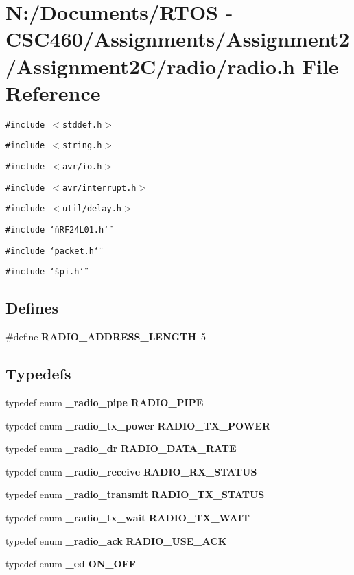 \section{N:/Documents/RTOS - CSC460/Assignments/Assignment2/Assignment2C/radio/radio.h File Reference}
\label{radio_8h}
{\tt \#include $<$stddef.h$>$}\par
{\tt \#include $<$string.h$>$}\par
{\tt \#include $<$avr/io.h$>$}\par
{\tt \#include $<$avr/interrupt.h$>$}\par
{\tt \#include $<$util/delay.h$>$}\par
{\tt \#include \char`\"{}n\-RF24L01.h\char`\"{}}\par
{\tt \#include \char`\"{}packet.h\char`\"{}}\par
{\tt \#include \char`\"{}spi.h\char`\"{}}\par
\subsection*{Defines}
\begin{CompactItemize}
\item 
\#define {\bf RADIO\_\-ADDRESS\_\-LENGTH}~5
\end{CompactItemize}
\subsection*{Typedefs}
\begin{CompactItemize}
\item 
typedef enum {\bf \_\-radio\_\-pipe} {\bf RADIO\_\-PIPE}
\item 
typedef enum {\bf \_\-radio\_\-tx\_\-power} {\bf RADIO\_\-TX\_\-POWER}
\item 
typedef enum {\bf \_\-radio\_\-dr} {\bf RADIO\_\-DATA\_\-RATE}
\item 
typedef enum {\bf \_\-radio\_\-receive} {\bf RADIO\_\-RX\_\-STATUS}
\item 
typedef enum {\bf \_\-radio\_\-transmit} {\bf RADIO\_\-TX\_\-STATUS}
\item 
typedef enum {\bf \_\-radio\_\-tx\_\-wait} {\bf RADIO\_\-TX\_\-WAIT}
\item 
typedef enum {\bf \_\-radio\_\-ack} {\bf RADIO\_\-USE\_\-ACK}
\item 
typedef enum {\bf \_\-ed} {\bf ON\_\-OFF}
\end{CompactItemize}
